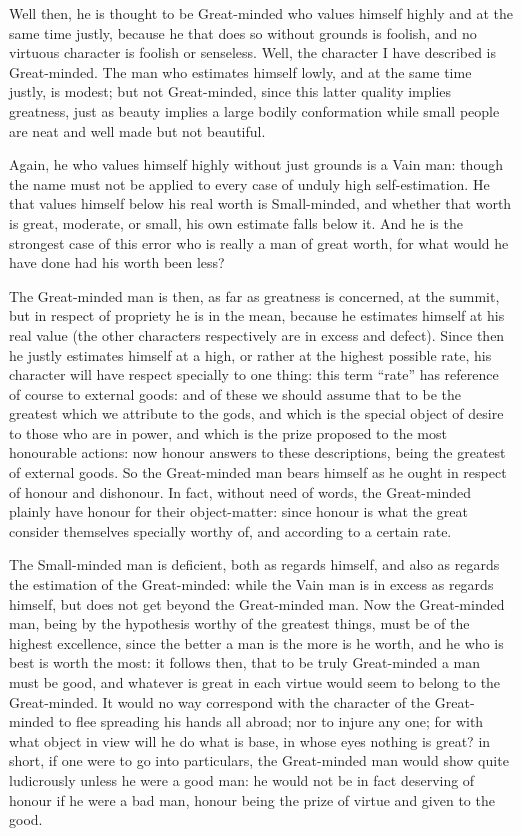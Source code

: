 Well then, he is thought to be Great-minded who values himself highly and at
the same time justly, because he that does so without grounds is foolish, and
no virtuous character is foolish or senseless. Well, the character I have
described is Great-minded. The man who estimates himself lowly, and at the same
time justly, is modest; but not Great-minded, since this latter quality implies
greatness, just as beauty implies a large bodily conformation while small
people are neat and well made but not beautiful.

Again, he who values himself highly without just grounds is a Vain man: though
the name must not be applied to every case of unduly high self-estimation. He
that values himself below his real worth is Small-minded, and whether that
worth is great, moderate, or small, his own estimate falls below it. And he is
the strongest case of this error who is really a man of great worth, for what
would he have done had his worth been less?

The Great-minded man is then, as far as greatness is concerned, at the summit,
but in respect of propriety he is in the mean, because he estimates himself at
his real value (the other characters respectively are in excess and defect).
Since then he justly estimates himself at a high, or rather at the highest
possible rate, his character will have respect specially to one thing: this
term “rate” has reference of course to external goods: and of these
we should assume that to be the greatest which we attribute to the gods, and
which is the special object of desire to those who are in power, and which is
the prize proposed to the most honourable actions: now honour answers to these
descriptions, being the greatest of external goods. So the Great-minded man
bears himself as he ought in respect of honour and dishonour. In fact, without
need of words, the Great-minded plainly have honour for their object-matter:
since honour is what the great consider themselves specially worthy of, and
according to a certain rate.

The Small-minded man is deficient, both as regards himself, and also as regards
the estimation of the Great-minded: while the Vain man is in excess as regards
himself, but does not get beyond the Great-minded man. Now the Great-minded
man, being by the hypothesis worthy of the greatest things, must be of the
highest excellence, since the better a man is the more is he worth, and he who
is best is worth the most: it follows then, that to be truly Great-minded a man
must be good, and whatever is great in each virtue would seem to belong to the
Great-minded. It would no way correspond with the character of the Great-minded
to flee spreading his hands all abroad; nor to injure any one; for with what
object in view will he do what is base, in whose eyes nothing is great? in
short, if one were to go into particulars, the Great-minded man would show
quite ludicrously unless he were a good man: he would not be in fact deserving
of honour if he were a bad man, honour being the prize of virtue and given to
the good.

